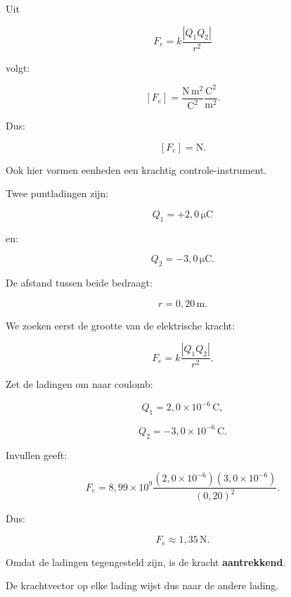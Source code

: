 \documentclass{ximera}
\begin{document}


Uit

\[
F_e=k\frac{|Q_1Q_2|}{r^2}
\]

volgt:

\[
[F_e]
=
\frac{\mathrm{N\,m^2}}{\mathrm{C^2}}
\frac{\mathrm{C^2}}{\mathrm{m^2}}.
\]

Dus:

\[
\boxed{
[F_e]=\mathrm N.
}
\]

Ook hier vormen eenheden een krachtig controle-instrument.




\begin{voorbeeld}

Twee puntladingen zijn:

\[
Q_1=+2{,}0\,\mathrm{\mu C}
\]

en:

\[
Q_2=-3{,}0\,\mathrm{\mu C}.
\]

De afstand tussen beide bedraagt:

\[
r=0{,}20\,\mathrm m.
\]

We zoeken eerst de grootte van de elektrische kracht:

\[
F_e
=
k\frac{|Q_1Q_2|}{r^2}.
\]

Zet de ladingen om naar coulomb:

\[
Q_1=2{,}0\times10^{-6}\,\mathrm C,
\]

\[
Q_2=-3{,}0\times10^{-6}\,\mathrm C.
\]

Invullen geeft:

\[
F_e
=
8{,}99\times10^9
\frac{
(2{,}0\times10^{-6})
(3{,}0\times10^{-6})
}{
(0{,}20)^2
}.
\]

Dus:

\[
\boxed{
F_e\approx1{,}35\,\mathrm N.
}
\]

Omdat de ladingen tegengesteld zijn, is de kracht
\textbf{aantrekkend}.

De krachtvector op elke lading wijst dus naar de andere lading.

\end{voorbeeld}
\end{document}
